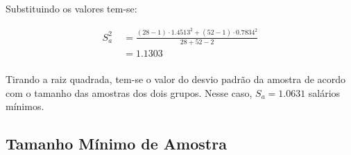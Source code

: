 Substituindo os valores tem-se:

\begin{align*}
 S^2_a &\; = \frac{(28 - 1) \cdot 1.4513^2 + (52 - 1) \cdot 0.7834^2}{28 + 52 - 2} \\
       &\; = 1.1303 \\
\end{align*}

Tirando a raiz quadrada, tem-se o valor do desvio padrão da amostra de acordo com o tamanho das amostras dos dois grupos. Nesse caso, $S_a = 1.0631$ salários mínimos.



\subsection{Tamanho Mínimo de Amostra}

